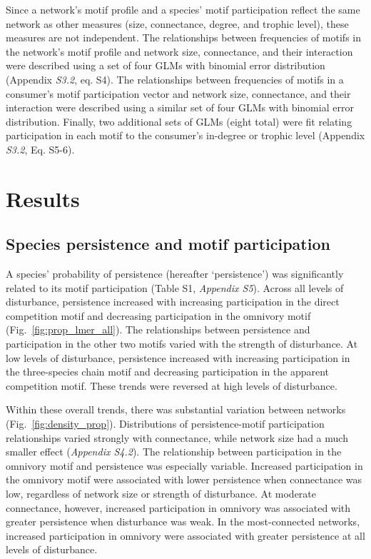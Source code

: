 \documentclass[12pt]{article}
\begin{document}
\begin{spacing}{2.0}
            Since a network's motif profile and a species' motif participation reflect the same network as other measures (size, connectance, degree, and trophic level), these measures are not independent. 
            The relationships between frequencies of motifs in the network's motif profile and network size, connectance, and their interaction were described using a set of four GLMs with binomial error distribution (Appendix \emph{S3.2}, eq. S4).
            The relationships between frequencies of motifs in a consumer's motif participation vector and network size, connectance, and their interaction were described using a similar set of four GLMs with binomial error distribution.
            Finally, two additional sets of GLMs (eight total) were fit relating participation in each motif to the consumer's in-degree or trophic level (Appendix \emph{S3.2}, Eq. S5-6).

        
\section*{Results}

    \subsection*{Species persistence and motif participation} 

        A species' probability of persistence (hereafter `persistence') was significantly related to its motif participation (Table S1, \emph{Appendix S5}).
        Across all levels of disturbance, persistence increased with increasing participation in the direct competition motif and decreasing participation in the omnivory motif (Fig.~\ref{fig:prop_lmer_all}).
        The relationships between persistence and participation in the other two motifs varied with the strength of disturbance.
        At low levels of disturbance, persistence increased with increasing participation in the three-species chain motif and decreasing participation in the apparent competition motif.
        These trends were reversed at high levels of disturbance.
    

        Within these overall trends, there was substantial variation between networks (Fig.~\ref{fig:density_prop}).
        Distributions of persistence-motif participation relationships varied strongly with connectance, while network size had a much smaller effect (\emph{Appendix S4.2}).
        The relationship between participation in the omnivory motif and persistence was especially variable.
        Increased participation in the omnivory motif were associated with lower  persistence when connectance was low, regardless of network size or strength of disturbance.
        At moderate connectance, however, increased participation in omnivory was associated with greater persistence when disturbance was weak.
        In the most-connected networks, increased participation in omnivory were associated with greater persistence at all levels of disturbance.


\end{spacing}
\end{document}
